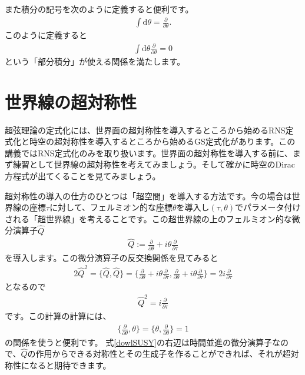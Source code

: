 \documentclass[report,paper=a4, fontsize=12pt, line_length=16cm, number_of_lines=33,dvipdfmx]{jlreq}
\numberwithin{equation}{chapter}
\numberwithin{equation}{section}
\newcommand{\del}{\partial}
\newcommand{\deldel}[2]{\frac{\del {#1}}{\del {#2}}}
\newcommand{\Qh}{\widehat{Q}}
\newcommand{\di}{\mathrm{d}}
\begin{document}
また積分の記号を次のように定義すると便利です。
\begin{align}
\int \di \theta =\deldel{}{\theta}.
\end{align}
このように定義すると
\begin{align}
\int \di \theta\deldel{}{\theta}=0
\end{align}
という「部分積分」が使える関係を満たします。

\section{世界線の超対称性}
超弦理論の定式化には、世界面の超対称性を導入するところから始めるRNS定式化と時空の超対称性を導入するところから始めるGS定式化があります。この講義ではRNS定式化のみを取り扱います。世界面の超対称性を導入する前に、まず練習として世界線の超対称性を考えてみましょう。そして確かに時空のDirac方程式が出てくることを見てみましょう。

超対称性の導入の仕方のひとつは「超空間」を導入する方法です。今の場合は世界線の座標$\tau$に対して、フェルミオン的な座標$\theta$を導入し$(\tau,\theta)$でパラメータ付けされる「超世界線」を考えることです。この超世界線の上のフェルミオン的な微分演算子$\Qh$
\begin{align}
\Qh := \deldel{}{\theta} + i \theta \deldel{}{\tau}
\end{align}
を導入します。この微分演算子の反交換関係を見てみると
\begin{align}
2\Qh^2=\{\Qh,\Qh\}=\{\deldel{}{\theta} + i \theta \deldel{}{\tau},\deldel{}{\theta} + i \theta \deldel{}{\tau}\}=2i\deldel{}{\tau}
\end{align}
となるので
\begin{align}
\Qh^2=i\deldel{}{\tau}\label{dowlSUSY}
\end{align}
です。この計算の計算には、
\begin{align}
\{\deldel{}{\theta},\theta\}=\{\theta,\deldel{}{\theta}\}=1
\end{align}
の関係を使うと便利です。
式\eqref{dowlSUSY}の右辺は時間並進の微分演算子なので、$\Qh$の作用からできる対称性とその生成子を作ることができれば、それが超対称性になると期待できます。
\end{document}
